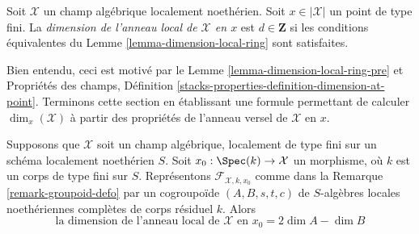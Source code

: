 \begin{definition}
\label{definition-dimension-local-ring}
Soit $\mathcal{X}$ un champ algébrique localement noethérien.
Soit $x \in |\mathcal{X}|$ un point de type fini.
La {\it dimension de l'anneau local de $\mathcal{X}$ en $x$}
est $d \in \mathbf{Z}$ si les conditions équivalentes du
Lemme \ref{lemma-dimension-local-ring} sont satisfaites.
\end{definition}

\noindent
Bien entendu, ceci est motivé par le Lemme \ref{lemma-dimension-local-ring-pre}
et Propriétés des champs, Définition
\ref{stacks-properties-definition-dimension-at-point}.
Terminons cette section en établissant une formule permettant de
calculer $\dim_x(\mathcal{X})$ à partir des propriétés de l'anneau versel
de $\mathcal{X}$ en $x$.

\begin{lemma}
\label{lemma-dimension-formula}
Supposons que $\mathcal{X}$ soit un champ algébrique, localement de type fini
sur un schéma localement noethérien $S$. Soit $x_0 : \Spec(k) \to \mathcal{X}$
un morphisme, où $k$ est un corps de type fini sur $S$. Représentons
$\mathcal{F}_{\mathcal{X}, k, x_0}$ comme dans la Remarque \ref{remark-groupoid-defo}
par un cogroupoïde $(A, B, s, t, c)$ de $S$-algèbres locales noethériennes complètes
de corps résiduel $k$. Alors
$$
\text{la dimension de l'anneau local de }\mathcal{X}\text{ en }x_0 =
2\dim A - \dim B
$$
\end{lemma}

